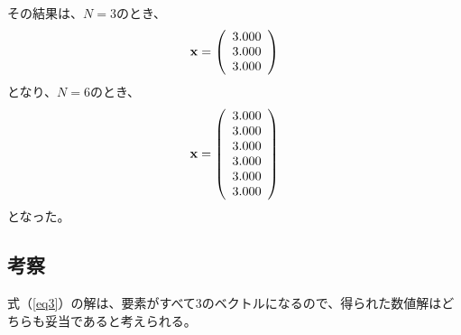 \documentclass[11pt]{ltjsarticle}
\begin{document}
			その結果は、$N=3$のとき、
			\[
				{\bf x} =
				\left(
					\begin{array}{c}
						3.000\\
						3.000\\
						3.000
					\end{array}
				\right)
			\]
			となり、$N=6$のとき、
			\[
				{\bf x} =
				\left(
					\begin{array}{c}
						3.000\\
						3.000\\
						3.000\\
						3.000\\
						3.000\\
						3.000
					\end{array}
				\right)
			\]
			となった。

		\subsection{考察}
			式（\ref{eq3}）の解は、要素がすべて3のベクトルになるので、得られた数値解はどちらも妥当であると考えられる。
\end{document}
